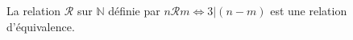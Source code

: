 La relation $\mathcal R$ sur $\mathbb N$ définie par $n\mathcal R m \iff 3 | (n-m)$ est une relation d'équivalence.

\begin{reponses}
\end{reponses}

